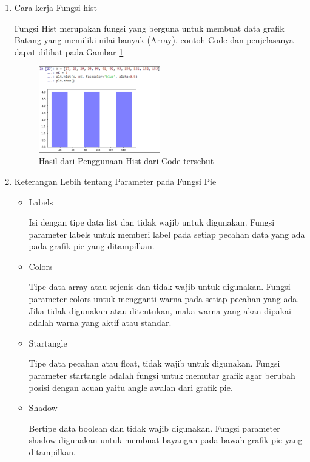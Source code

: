 \begin{enumerate}
\item Cara kerja Fungsi hist
\par Fungsi Hist merupakan fungsi yang berguna untuk membuat data grafik Batang yang memiliki nilai banyak (Array). contoh Code dan penjelasanya dapat dilihat pada Gambar \ref{data2}

\begin{figure} [!htbp]
	\centerline{\includegraphics[width=0.5\textwidth]{figures/chapter6/1164074/2}}
	\caption{Hasil dari Penggunaan Hist dari Code tersebut}
	\label{data2}
\end{figure}

\item Keterangan Lebih tentang Parameter pada Fungsi Pie
\begin{itemize}
\item Labels
\par Isi dengan tipe data list dan tidak wajib untuk digunakan. Fungsi parameter labels untuk memberi label pada setiap pecahan data yang ada pada grafik pie yang ditampilkan.

\item Colors
\par Tipe data array atau sejenis dan tidak wajib untuk digunakan. Fungsi parameter colors untuk mengganti warna pada setiap pecahan yang ada. Jika tidak digunakan atau ditentukan, maka warna yang akan dipakai adalah warna yang aktif atau standar.
	
\item Startangle
\par Tipe data pecahan atau float, tidak wajib untuk digunakan. Fungsi parameter startangle adalah fungsi untuk memutar grafik agar berubah posisi dengan acuan yaitu angle awalan dari grafik pie.

	
\item Shadow
\par Bertipe data boolean dan tidak wajib digunakan. Fungsi parameter shadow digunakan untuk membuat bayangan pada bawah grafik pie yang ditampilkan. 
	

\end{itemize}
\end{enumerate}
